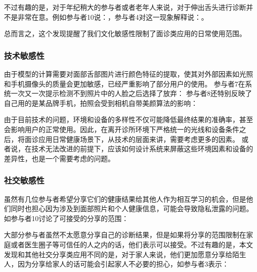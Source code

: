 不过有趣的是，对于年纪稍大的参与者或者老年人来说，对于伸出舌头进行诊断并不是非常在意。例如参与者10说：，参与者4对这一现象解释说：。

总而言之，这个发现提醒了我们文化敏感性限制了面诊类应用的日常使用范围。


\subsubsection{技术敏感性}


由于模型的计算需要对面部舌部图片进行颜色特征的提取，使其对外部因素如光照和手机摄像头的质量会更加敏感，已经严重影响了部分用户的使用。
参与者7在系统一次又一次提示检测不到照片中的人脸之后选择了放弃：
参与者8还特别反映了自己用的是某品牌手机，拍照会受到相机自带美颜算法的影响：

由于目前技术的问题，环境和设备的多样性不仅可能降低最终结果的准确率，甚至会影响用户的正常使用。因此，在离开诊所环境下严格统一的光线和设备条件之后，将面诊应用日常健康场景下，从技术的层面来讲，需要考虑更多的因素。
或者说，在技术无法改进的前提下，应该如何设计系统来屏蔽这些环境因素和设备的差异性，也是一个需要考虑的问题。

\subsubsection{社交敏感性}


虽然有几位参与者希望分享它们的健康结果给其他人作为相互学习的机会，但是他们同时也担心因为涉及到面部照片和个人健康信息，可能会导致隐私泄露的问题。
如参与者10讨论了可接受的分享的范围：

大部分参与者虽然不太愿意分享自己的诊断结果，但是如果将分享的范围限制在家庭或者医生圈子等可信任的人之内的话，他们表示可以接受。不过有趣的是，本文发现和其他社交分享类应用不同的是，对于家人来说，他们更加愿意分享给陌生人，因为分享给家人的话可能会引起家人不必要的担心，如参与者3表示：


